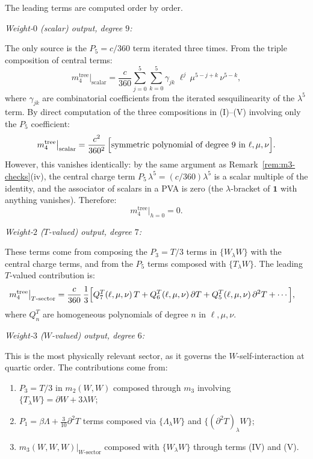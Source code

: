 \smallskip
The leading terms are computed order by order.

\smallskip
\emph{Weight-$0$ (scalar) output, degree $9$:}

The only source is the $P_5 = c/360$ term iterated three times.
From the triple composition of central terms:
\begin{equation}
\label{eq:m4-scalar-degree9}
m_4^{\mathrm{tree}}\big|_{\mathrm{scalar}}
= \frac{c}{360}\sum_{j=0}^{5}\sum_{k=0}^{5}
\gamma_{jk}\;\ell^j\,\mu^{5-j+k}\,\nu^{5-k},
\end{equation}
where $\gamma_{jk}$ are combinatorial coefficients from the
iterated sesquilinearity of the $\lambda^5$ term. By direct
computation of the three compositions in (I)--(V) involving
only the $P_5$ coefficient:
\begin{equation}
\label{eq:m4-pure-central}
m_4^{\mathrm{tree}}\big|_{\mathrm{scalar}}
= \frac{c^2}{360^2}\,\Bigl[
 \text{symmetric polynomial of degree $9$ in $\ell,\mu,\nu$}
 \Bigr].
\end{equation}
However, this vanishes identically: by the same argument as
Remark~\ref{rem:m3-checks}(iv), the central charge term
$P_5\,\lambda^5 = (c/360)\lambda^5$ is a scalar multiple
of the identity, and the associator of scalars in a PVA is zero
(the $\lambda$-bracket of $\mathbf{1}$ with anything vanishes).
Therefore:
\begin{equation}
\label{eq:m4-scalar-vanishes}
m_4^{\mathrm{tree}}\big|_{h=0} = 0.
\end{equation}

\smallskip
\emph{Weight-$2$ ($T$-valued) output, degree $7$:}

These terms come from composing the $P_3 = T/3$ terms in
$\{W_\lambda W\}$ with the central charge terms, and from the
$P_5$ terms composed with $\{T_\lambda W\}$. The leading
$T$-valued contribution is:
\begin{align}
\label{eq:m4-T-sector}
m_4^{\mathrm{tree}}\big|_{T\text{-sector}}
&= \frac{c}{360}\,\frac{1}{3}\Bigl[
 Q_7^T(\ell,\mu,\nu)\,T
 + Q_6^T(\ell,\mu,\nu)\,\partial T
 + Q_5^T(\ell,\mu,\nu)\,\partial^2 T
 + \cdots\Bigr],
\end{align}
where $Q_n^T$ are homogeneous polynomials of degree $n$ in
$\ell,\mu,\nu$.

\smallskip
\emph{Weight-$3$ ($W$-valued) output, degree $6$:}

This is the most physically relevant sector, as it governs the
$W$-self-interaction at quartic order. The contributions come from:
\begin{enumerate}
\item[(a)] $P_3 = T/3$ in $m_2(W,W)$ composed through $m_3$
involving $\{T_\lambda W\} = \partial W + 3\lambda W$;
\item[(b)] $P_1 = \beta\Lambda + \tfrac{3}{10}\partial^2 T$
terms composed via $\{\Lambda_\lambda W\}$ and
$\{(\partial^2 T)_\lambda W\}$;
\item[(c)] $m_3(W,W,W)|_{W\text{-sector}}$ composed with
$\{W_\lambda W\}$ through terms (IV) and (V).
\end{enumerate}

